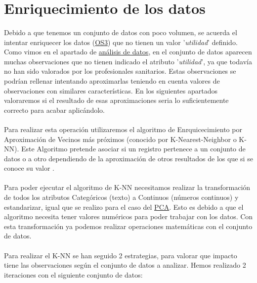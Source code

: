 \section{Enriquecimiento de los datos}
\label{section:knn}

\paragraph{}
Debido a que tenemos un conjunto de datos con poco volumen, se acuerda el intentar enriquecer los datos (\hyperref[os:OS3]{OS3}) que no tienen un valor '\textit{utilidad}' definido. Como vimos en el apartado de \hyperref[section:analisis_datos_utilidad]{análisis de datos}, en el conjunto de datos aparecen muchas observaciones que no tienen indicado el atributo '\textit{utilidad}', ya que todavía no han sido valorados por los profesionales sanitarios. Estas observaciones se podrían rellenar intentando aproximarlas teniendo en cuenta valores de observaciones con similares características. En los siguientes apartados valoraremos si el resultado de esas aproximaciones seria lo suficientemente correcto para acabar aplicándolo.

\paragraph{}
Para realizar esta operación utilizaremos el algoritmo de Enrquicecimiento por Aproximación de Vecinos más próximos (conocido por K-Nearest-Neighbor o K-NN). Este Algoritmo pretende asociar si un registro pertenece a un conjunto de datos o a otro dependiendo de la aproximación de otros resultados de los que si se conoce su valor \cite{ref:knn_def}.

\paragraph{}
Para poder ejecutar el algoritmo de K-NN necesitamos realizar la transformación de todos los
atributos Categóricos (texto) a Continuos (números continuos) y estandarizar, igual que se realizo para el caso del \hyperref[section:pca_standar]{PCA}. Esto es debido a que el algoritmo necesita tener valores numéricos para poder trabajar con los datos\cite{ref:knn_scaling}. Con esta transformación ya podemos realizar operaciones matemáticas con el conjunto de datos.

\paragraph{}
Para realizar el K-NN se han seguido 2 estrategias, para valorar que impacto tiene las observaciones según el conjunto de datos a analizar. Hemos realizado 2 iteraciones con el siguiente conjunto de datos:

